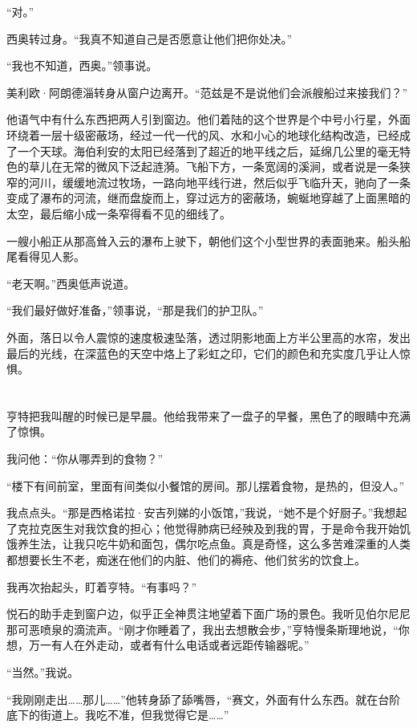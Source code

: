 \documentclass[AutoFakeBold=true]{book}
\begin{document}
``对。''

西奥转过身。``我真不知道自己是否愿意让他们把你处决。''

``我也不知道，西奥。''领事说。

美利欧·阿朗德淄转身从窗户边离开。``范兹是不是说他们会派艘船过来接我们？''

他语气中有什么东西把两人引到窗边。他们着陆的这个世界是个中号小行星，外面环绕着一层十级密蔽场，经过一代一代的风、水和小心的地球化结构改造，已经成了一个天球。海伯利安的太阳已经落到了超近的地平线之后，延绵几公里的毫无特色的草儿在无常的微风下泛起涟漪。飞船下方，一条宽阔的溪涧，或者说是一条狭窄的河川，缓缓地流过牧场，一路向地平线行进，然后似乎飞临升天，驰向了一条变成了瀑布的河流，继而盘旋而上，穿过远方的密蔽场，蜿蜒地穿越了上面黑暗的太空，最后缩小成一条窄得看不见的细线了。

一艘小船正从那高耸入云的瀑布上驶下，朝他们这个小型世界的表面驰来。船头船尾看得见人影。

``老天啊。''西奥低声说道。

``我们最好做好准备，''领事说，``那是我们的护卫队。''

外面，落日以令人震惊的速度极速坠落，透过阴影地面上方半公里高的水帘，发出最后的光线，在深蓝色的天空中烙上了彩虹之印，它们的颜色和充实度几乎让人惊惧。

\chapter{}

亨特把我叫醒的时候已是早晨。他给我带来了一盘子的早餐，黑色了的眼睛中充满了惊惧。

我问他：``你从哪弄到的食物？''

``楼下有间前室，里面有间类似小餐馆的房间。那儿摆着食物，是热的，但没人。''

我点点头。``那是西格诺拉·安吉列娣的小饭馆，''我说，``她不是个好厨子。''我想起了克拉克医生对我饮食的担心；他觉得肺病已经殃及到我的胃，于是命令我开始饥饿养生法，让我只吃牛奶和面包，偶尔吃点鱼。真是奇怪，这么多苦难深重的人类都想要长生不老，痴迷在他们的内脏、他们的褥疮、他们贫劣的饮食上。

我再次抬起头，盯着亨特。``有事吗？''

悦石的助手走到窗户边，似乎正全神贯注地望着下面广场的景色。我听见伯尔尼尼那可恶喷泉的滴流声。``刚才你睡着了，我出去想散会步，''亨特慢条斯理地说，``你想，万一有人在外走动，或者有什么电话或者远距传输器呢。''

``当然。''我说。

``我刚刚走出……那儿……''他转身舔了舔嘴唇，``赛文，外面有什么东西。就在台阶底下的街道上。我吃不准，但我觉得它是……''
\end{document}

